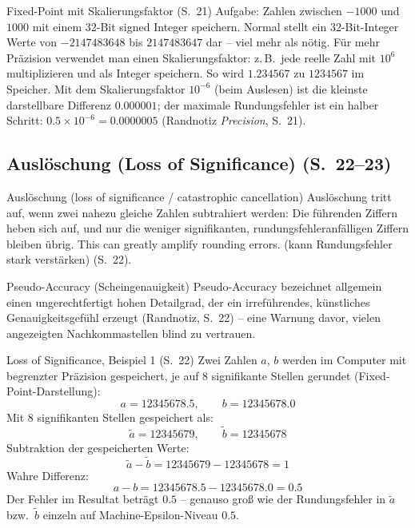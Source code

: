 \begin{bspbox}{Fixed-Point mit Skalierungsfaktor (S.~21)}
Aufgabe: Zahlen zwischen $-1000$ und $1000$ mit einem 32-Bit signed Integer speichern. Normal stellt ein 32-Bit-Integer Werte von $-2147483648$ bis $2147483647$ dar -- viel mehr als nötig. Für mehr Präzision verwendet man einen Skalierungsfaktor: z.\,B.\ jede reelle Zahl mit $10^6$ multiplizieren und als Integer speichern. So wird $1.234567$ zu $1234567$ im Speicher. Mit dem Skalierungsfaktor $10^{-6}$ (beim Auslesen) ist die kleinste darstellbare Differenz $0.000001$; der maximale Rundungsfehler ist ein halber Schritt: $0.5 \times 10^{-6} = 0.0000005$ (Randnotiz \emph{Precision}, S.~21).
\end{bspbox}

\subsection{Auslöschung (Loss of Significance) (S.~22--23)}

\begin{defbox}{Auslöschung (loss of significance / catastrophic cancellation)}
Auslöschung tritt auf, wenn zwei nahezu gleiche Zahlen subtrahiert werden: Die führenden Ziffern heben sich auf, und nur die weniger signifikanten, rundungsfehleranfälligen Ziffern bleiben übrig. \glqq This can greatly amplify rounding errors.\grqq{} (kann Rundungsfehler stark verstärken) (S.~22).
\end{defbox}

\begin{defbox}{Pseudo-Accuracy (Scheingenauigkeit)}
Pseudo-Accuracy bezeichnet allgemein einen ungerechtfertigt hohen Detailgrad, der ein irreführendes, künstliches Genauigkeitsgefühl erzeugt (Randnotiz, S.~22) -- eine Warnung davor, vielen angezeigten Nachkommastellen blind zu vertrauen.
\end{defbox}

\begin{bspbox}{Loss of Significance, Beispiel 1 (S.~22)}
Zwei Zahlen $a$, $b$ werden im Computer mit begrenzter Präzision gespeichert, je auf 8 signifikante Stellen gerundet (Fixed-Point-Darstellung):
\[
a = 12345678.5, \qquad b = 12345678.0
\]
Mit 8 signifikanten Stellen gespeichert als:
\[
\tilde{a} = 12345679, \qquad \tilde{b} = 12345678
\]
Subtraktion der gespeicherten Werte:
\[
\tilde{a} - \tilde{b} = 12345679 - 12345678 = 1
\]
Wahre Differenz:
\[
a - b = 12345678.5 - 12345678.0 = 0.5
\]
Der Fehler im Resultat beträgt $0.5$ -- genauso groß wie der Rundungsfehler in $\tilde{a}$ bzw.\ $\tilde{b}$ einzeln auf Machine-Epsilon-Niveau $0.5$.
\end{bspbox}

